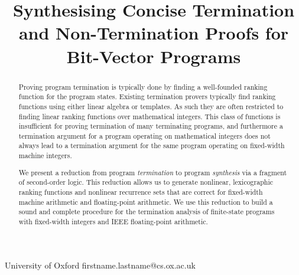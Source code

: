 \documentclass[preprint]{sigplanconf}
\theoremstyle{definition}
\begin{document}
\setlength{\pdfpageheight}{\paperheight}
\setlength{\pdfpagewidth}{\paperwidth}





\title{Synthesising Concise Termination and Non-Termination Proofs for Bit-Vector Programs}

           {University of Oxford}
           {firstname.lastname@cs.ox.ac.uk}

\maketitle

\begin{abstract}
%
Proving program termination is typically done by finding a well-founded
ranking function for the program states.  Existing termination
provers typically find ranking functions using either linear algebra or
templates.  As such they are often restricted to finding linear ranking
functions over mathematical integers.  This class of functions is
insufficient for proving termination of many terminating programs, and
furthermore a termination argument for a program operating on mathematical
integers does not always lead to a termination argument for the same program
operating on fixed-width machine integers.

We present a reduction from program \emph{termination} to program
\emph{synthesis} via a fragment of second-order logic.  This reduction
allows us to generate nonlinear, lexicographic ranking functions and
nonlinear recurrence sets that are correct for fixed-width machine arithmetic
and floating-point arithmetic.  We use this reduction to build a sound and
complete procedure for the termination analysis of finite-state programs with fixed-width
integers and IEEE floating-point arithmetic.
%
\end{abstract}
\end{document}
